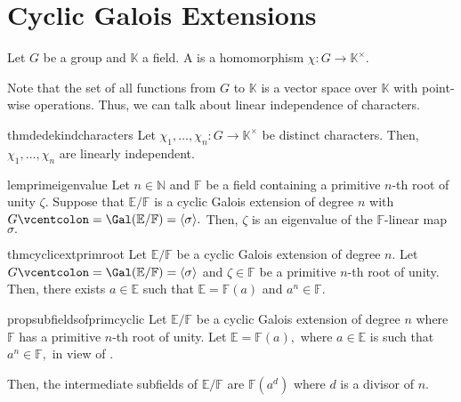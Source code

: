 \section{Cyclic Galois Extensions}
\begin{defn}%
	Let $G$ be a group and $\mathbb{K}$ a field. A  is a homomorphism $\chi : G \to \mathbb{K}^\times.$
\end{defn}

\begin{rem}
	Note that the set of all functions from $G$ to $\mathbb{K}$ is a vector space over $\mathbb{K}$ with point-wise operations. Thus, we can talk about linear independence of characters.
\end{rem}

\begin{restatable}[Dedekind]{thm}{dedekindcharacters}
\label{thm:dedekindcharacters}
	Let $\chi_1, \ldots, \chi_n : G \to \mathbb{K}^\times$ be distinct characters. Then, $\chi_1, \ldots, \chi_n$ are linearly independent. \hfill\hyperref[thm:dedekindcharacters2]{\downsym}
\end{restatable}

\begin{restatable}[]{lem}{primeigenvalue}
\label{lem:primeigenvalue}
	Let $n \in \mathbb{N}$ and $\mathbb{F}$ be a field containing a primitive $n$-th root of unity $\zeta.$ Suppose that $\mathbb{E}/\mathbb{F}$ is a cyclic Galois extension of degree $n$ with $G \vcentcolon= \Gal(\mathbb{E}/\mathbb{F}) = \langle \sigma\rangle.$ Then, $\zeta$ is an eigenvalue of the $\mathbb{F}$-linear map $\sigma.$ \hfill\hyperref[lem:primeigenvalue2]{\downsym}
\end{restatable}

\begin{restatable}[]{thm}{cyclicextprimroot}
\label{thm:cyclicextprimroot}
	Let $\mathbb{E}/\mathbb{F}$ be a cyclic Galois extension of degree $n.$ Let $G \vcentcolon= \Gal(\mathbb{E}/\mathbb{F}) = \langle \sigma\rangle$ and $\zeta \in \mathbb{F}$ be a primitive $n$-th root of unity. Then, there exists $a \in \mathbb{E}$ such that $\mathbb{E} = \mathbb{F}(a)$ and $a^n \in \mathbb{F}.$ \hfill\hyperref[thm:cyclicextprimroot2]{\downsym}
\end{restatable}

\begin{restatable}[]{prop}{subfieldsofprimcyclic}
\label{prop:subfieldsofprimcyclic}
	Let $\mathbb{E}/\mathbb{F}$ be a cyclic Galois extension of degree $n$ where $\mathbb{F}$ has a primitive $n$-th root of unity. Let $\mathbb{E} = \mathbb{F}(a),$ where $a \in \mathbb{E}$ is such that $a^n \in \mathbb{F},$ in view of .

	Then, the intermediate subfields of $\mathbb{E}/\mathbb{F}$ are $\mathbb{F}(a^d)$ where $d$ is a divisor of $n.$ \hfill\hyperref[prop:subfieldsofprimcyclic2]{\downsym}
\end{restatable}